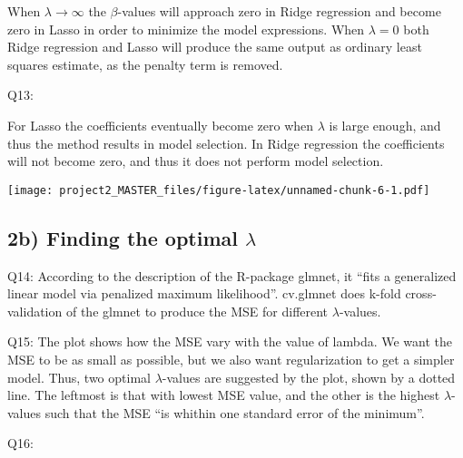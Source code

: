\documentclass[]{article}
\newenvironment{Shaded}{\begin{snugshade}}{\end{snugshade}}
\newcommand{\KeywordTok}[1]{\textcolor[rgb]{0.13,0.29,0.53}{\textbf{#1}}}
\newcommand{\DataTypeTok}[1]{\textcolor[rgb]{0.13,0.29,0.53}{#1}}
\newcommand{\DecValTok}[1]{\textcolor[rgb]{0.00,0.00,0.81}{#1}}
\newcommand{\FloatTok}[1]{\textcolor[rgb]{0.00,0.00,0.81}{#1}}
\newcommand{\CommentTok}[1]{\textcolor[rgb]{0.56,0.35,0.01}{\textit{#1}}}
\newcommand{\OtherTok}[1]{\textcolor[rgb]{0.56,0.35,0.01}{#1}}
\newcommand{\OperatorTok}[1]{\textcolor[rgb]{0.81,0.36,0.00}{\textbf{#1}}}
\newcommand{\NormalTok}[1]{#1}
\begin{document}
When \(\lambda \rightarrow \infty\) the \(\beta\)-values will approach
zero in Ridge regression and become zero in Lasso in order to minimize
the model expressions. When \(\lambda = 0\) both Ridge regression and
Lasso will produce the same output as ordinary least squares estimate,
as the penalty term is removed.

Q13:

For Lasso the coefficients eventually become zero when \(\lambda\) is
large enough, and thus the method results in model selection. In Ridge
regression the coefficients will not become zero, and thus it does not
perform model selection.

\texttt{[image: project2\_MASTER\_files/figure-latex/unnamed-chunk-6-1.pdf]}

\subsection{\texorpdfstring{2b) Finding the optimal
\(\lambda\)}{2b) Finding the optimal \textbackslash{}lambda}}\label{b-finding-the-optimal-lambda}

Q14: According to the description of the R-package glmnet, it ``fits a
generalized linear model via penalized maximum likelihood''. cv.glmnet
does k-fold cross-validation of the glmnet to produce the MSE for
different \(\lambda\)-values.

Q15: The plot shows how the MSE vary with the value of lambda. We want
the MSE to be as small as possible, but we also want regularization to
get a simpler model. Thus, two optimal \(\lambda\)-values are suggested
by the plot, shown by a dotted line. The leftmost is that with lowest
MSE value, and the other is the highest \(\lambda\)-values such that the
MSE ``is whithin one standard error of the minimum''.

Q16:

\begin{Shaded}
\end{Shaded}
\end{document}
